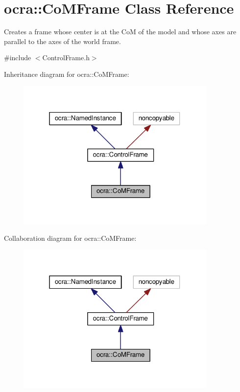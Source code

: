 \hypertarget{classocra_1_1CoMFrame}{}\section{ocra\+:\+:Co\+M\+Frame Class Reference}
\label{classocra_1_1CoMFrame}


Creates a frame whose center is at the CoM of the model and whose axes are parallel to the axes of the world frame.  




{\ttfamily \#include $<$Control\+Frame.\+h$>$}



Inheritance diagram for ocra\+:\+:Co\+M\+Frame\+:
\nopagebreak
\begin{figure}[H]
\begin{center}
\leavevmode
\includegraphics[width=280pt]{d3/d86/classocra_1_1CoMFrame__inherit__graph}
\end{center}
\end{figure}


Collaboration diagram for ocra\+:\+:Co\+M\+Frame\+:
\nopagebreak
\begin{figure}[H]
\begin{center}
\leavevmode
\includegraphics[width=280pt]{d5/de9/classocra_1_1CoMFrame__coll__graph}
\end{center}
\end{figure}
